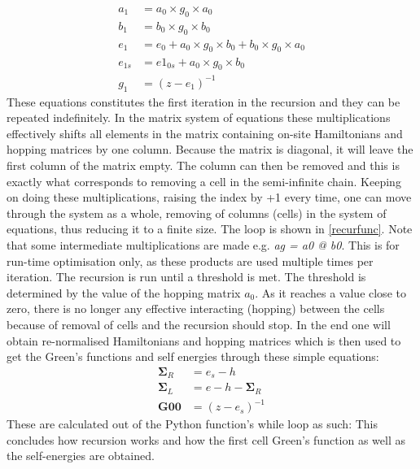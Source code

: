 \begin{align}
	a_1    & = a_0 \times g_0 \times a_0                  \nonumber                      \\
	b_1    & = b_0\times g_0\times b_0                   \nonumber                       \\
	e_1    & = e_0 + a_0\times g_0\times b_0 + b_0\times g_0\times a_0 \label{matmulrec} \\
	e_{1s} & = e1_{0s} + a_0\times g_0\times b_0          \nonumber                      \\
	g_1    & = (z - e_1)^{-1} \nonumber
\end{align}
These equations constitutes the first iteration in the recursion and they can be repeated indefinitely. In the matrix system of equations these multiplications effectively shifts all elements in the matrix containing on-site Hamiltonians and hopping matrices by one column. Because the matrix is diagonal, it will leave the first column of the matrix empty. The column can then be removed and this is exactly what corresponds to removing a cell in the semi-infinite chain. Keeping on doing these multiplications, raising the index by +1 every time, one can move through the system as a whole, removing of columns (cells) in the system of equations, thus reducing it to a finite size. The loop is shown in \cref{recurfunc}.
\vspace{-.5\baselineskip}
\vspace{\baselineskip}
Note that some intermediate multiplications are made e.g. \textit{ag = a0 @ b0}. This is for run-time optimisation only, as these products are used multiple times per iteration.
The recursion is run until a threshold is met. The threshold is determined by the value of the hopping matrix \(a_0\). As it reaches a value close to zero, there is no longer any effective interacting (hopping) between the cells because of removal of cells and the recursion should stop.
In the end one will obtain re-normalised Hamiltonians and hopping matrices which is then used to get the Green's functions and self energies through these simple equations:
\begin{align}
	\mathbf{\Sigma}_R & = e_s - h                   \nonumber       \\
	\mathbf{\Sigma}_L & = e - h - \mathbf{\Sigma}_R \label{outputs} \\
	\mathbf{G00}      & = (z - e_s)^{-1} \nonumber
\end{align}
These are calculated out of the Python function's while loop as such:
\vspace{-.5\baselineskip}
\vspace{\baselineskip}
This concludes how recursion works and how the first cell Green's function as well as the self-energies are obtained.
